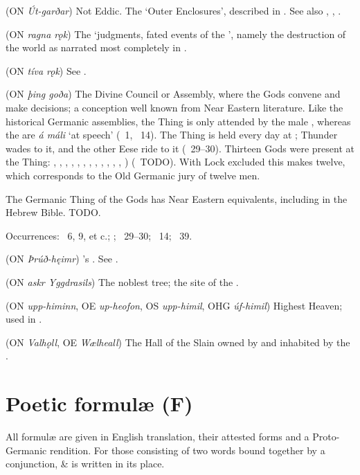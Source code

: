 \begin{itemize}
 (ON \emph{Út-garðar})
  Not Eddic.  The ‘Outer Enclosures’, described in \Gylfaginning. See also , , .

 (ON \emph{ragna rǫk})
  The ‘judgments, fated events of the ’, namely the destruction of the world as narrated most completely in \Voluspa.

 (ON \emph{tíva rǫk})
  See .

 (ON \emph{þing goða})
  The Divine Council or Assembly, where the Gods convene and make decisions; a conception well known from Near Eastern literature.  Like the historical Germanic assemblies, the Thing is only attended by the male , whereas the  are \emph{á máli} ‘at speech’ (\Baldrsdraumar\ 1, \Thrymskvida\ 14).  The Thing is held every day at ; Thunder wades to it, and the other Eese ride to it (\Grimnismal\ 29–30).  Thirteen Gods were present at the Thing: , , , , , , , , , , , , ) (\Gylfaginning\ TODO).  With Lock excluded this makes twelve, which corresponds to the Old Germanic jury of twelve men.

  The Germanic Thing of the Gods has Near Eastern equivalents, including in the Hebrew Bible.  TODO.

  Occurrences: \Voluspa\ 6, 9, et c.; ; \Grimnismal\ 29–30; \Thrymskvida\ 14; \Hymiskvida\ 39.

 (ON \emph{Þrúð-hęimr})
  ’s .  See .

 (ON \emph{askr Yggdrasils})
  The noblest tree; the site of the .

 (ON \emph{upp-himinn}, OE \emph{up-heofon}, OS \emph{upp-himil}, OHG \emph{úf-himil})
  Highest Heaven; used in .

 (ON \emph{Valhǫll}, OE \emph{Wælheall})
  The Hall of the Slain owned by  and inhabited by the .
\end{itemize}

\section{Poetic formulæ (F)}
All formulæ are given in English translation, their attested forms and a Proto-Germanic rendition. For those consisting of two words bound together by a conjunction, \& is written in its place.

